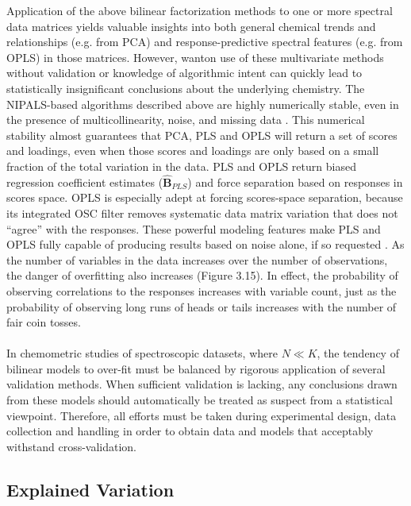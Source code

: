 \begin{doublespace}
Application of the above bilinear factorization methods to one or more
spectral data matrices yields valuable insights into both general chemical
trends and relationships (e.g. from PCA) and response-predictive spectral
features (e.g. from OPLS) in those matrices. However, wanton use of these
multivariate methods without validation or knowledge of algorithmic intent
can quickly lead to statistically insignificant conclusions about the
underlying chemistry. The NIPALS-based algorithms described above are
highly numerically stable, even in the presence of multicollinearity,
noise, and missing data \cite{wold:cils2001,andersson:jchemo2009}. This
numerical stability almost guarantees that PCA, PLS and OPLS will return
a set of scores and loadings, even when those scores and loadings are only
based on a small fraction of the total variation in the data. PLS and OPLS
return biased regression coefficient estimates ($\hat{\mathbf{B}}_{PLS}$)
and force separation based on responses in scores space. OPLS is especially
adept at forcing scores-space separation, because its integrated OSC filter
removes systematic data matrix variation that does not ``agree'' with the
responses. These powerful modeling features make PLS and OPLS fully capable
of producing results based on noise alone, if so requested
\cite{westerhuis:metab2008a}. As the number of variables in the data increases
over the number of observations, the danger of overfitting also increases
(Figure 3.15). In effect, the probability of observing correlations to the
responses increases with variable count, just as the probability of observing
long runs of heads or tails increases with the number of fair coin tosses.
\\\\
In chemometric studies of spectroscopic datasets, where $N \ll K$, the tendency
of bilinear models to over-fit must be balanced by rigorous application of
several validation methods. When sufficient validation is lacking, any
conclusions drawn from these models should automatically be treated as
suspect from a statistical viewpoint. Therefore, all efforts must be taken
during experimental design, data collection and handling in order to obtain
data and models that acceptably withstand cross-validation.
\end{doublespace}

\subsection{Explained Variation}


